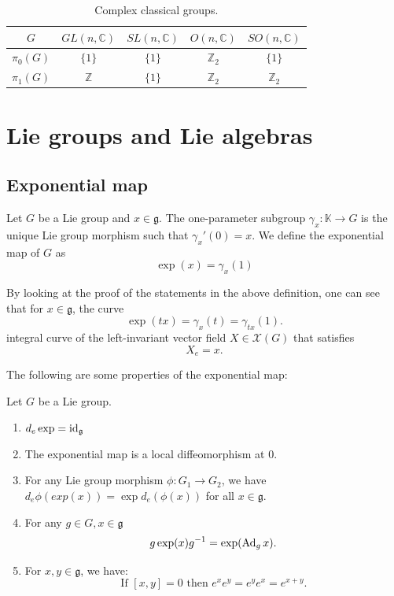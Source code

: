 \documentclass{report}
\begin{document}
\begin{table}[h!]
    \centering
    \begin{tabular}{c c c c c}
        $G$ & $GL(n, \mathbb{C})$ & $SL(n, \mathbb{C})$ & $O(n, \mathbb{C})$ & $SO(n, \mathbb{C})$ \\
        \hline \hline
        $\pi_0(G)$ & $\{1\}$ & $\{1\}$ & $\mathbb{Z}_2$ & $\{1\}$ \\
        $\pi_1(G)$ & $\mathbb{Z}$ & $\{1\}$ & $\mathbb{Z}_2$ & $\mathbb{Z}_2$ \\
    \end{tabular}
    \caption{Complex classical groups.}
    \label{table:complex_classical_groups}
\end{table}

\chapter{Lie groups and Lie algebras}
\section{Exponential map}
\begin{definition}
    Let $G$ be a Lie group and $x \in \mathfrak g$.
    The one-parameter subgroup $\gamma_x: \mathbb K \to G$ is the unique Lie group morphism such that $\gamma_x'(0) = x$.
    We define the exponential map of $G$ as
    \[
    \exp(x) = \gamma_x(1)
    \]
\end{definition}
\begin{remark}
    By looking at the proof of the statements in the above definition, one can see that for $x\in \mathfrak g$, the curve
    \[
    \exp(tx) = \gamma_x(t) = \gamma_{tx}(1).
    \]
    integral curve of the left-invariant vector field $X \in \mathcal X(G)$ that satisfies
    \[
    X_e = x.
    \]
\end{remark}

The following are some properties of the exponential map:
\begin{theorem}
    Let $G$ be a Lie group.
    \begin{enumerate}[label = (\roman*)]
        \item $d_{e} \exp = \operatorname{id}_{\mathfrak g}$
        \item The exponential map is a local diffeomorphism at $0$.
        \item For any Lie group morphism $\phi:G_1 \to G_2$, we have $d_e \phi (exp(x)) = \exp d_e (\phi(x))$ for all $x\in \mathfrak g$.
        \item For any $g \in G, x \in \mathfrak g$
        \[
        g \exp(x) g^{-1} = \exp(\operatorname{Ad}_g x).
        \]
        \item For $x, y \in \mathfrak g$, we have:
        \[
        \text{If } [x,y] = 0 \text{ then } e^x e^y = e^y e^x = e^{x+y}.
        \]
    \end{enumerate}
\end{theorem}
\end{document}
